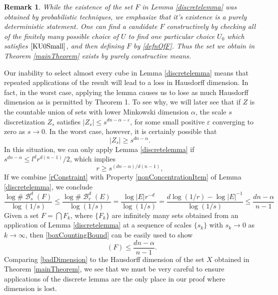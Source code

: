 \documentclass[dvipsnames,letterpaper,12pt]{article}
\numberwithin{equation}{section}
\theoremstyle{plain}
\newtheorem*{remark}{Remark}
\DeclareMathOperator{\hausdim}{\dim_{\mathbf{H}}}
\DeclareMathOperator{\B}{\mathcal{B}}
\begin{document}
\begin{remark}
	While the existence of the set $F$ in Lemma \ref{discretelemma} was obtained by probabilistic techniques, we emphasize that it's existence is a purely deterministic statement. One can find a candidate $F$ constructively by checking all of the finitely many possible choice of $U$ to find one particular choice $U_0$ which satisfies $\eqref{KU0Small}$, and then defining $F$ by \eqref{defnOfF}.
	Thus the set we obtain in Theorem \ref{mainTheorem} exists by purely constructive means.
\end{remark}

Our inability to select almost every cube in Lemma \ref{discretelemma} means that repeated applications of the result will lead to a loss in Hausdorff dimension. In fact, in the worst case, applying the lemma causes us to lose as much Hausdorff dimension as is permitted by Theorem 1. To see why, we will later see that if $Z$ is the countable union of sets with lower Minkowski dimension $\alpha$, the scale $s$ discretization $Z_s$ satisfies $|Z_s| \leq s^{dn - \alpha - \varepsilon}$, for some small positive $\varepsilon$ converging to zero as $s \to 0$. In the worst case, however, it is certainly possible that
%
\begin{equation}\label{ZsBadBound}
	|Z_s| \geq s^{dn - \alpha}.
\end{equation}
%
In this situation, we can only apply Lemma \ref{discretelemma} if $s^{dn - \alpha} \leq l^d r^{d(n-1)}/2$, which implies
%
\begin{equation} \label{rConstraint}
	r \geq s^{(dn - \alpha)/d(n-1)},
\end{equation}
%
If we combine \eqref{rConstraint} with Property \ref{nonConcentrationItem} of Lemma \ref{discretelemma}, we conclude
%
\begin{equation} \label{boxCountingBound}
	\frac{\log \# \B^d_s(F)}{\log(1/s)} \leq \frac{\log \# \B^d_r(E)}{\log(1/s)} = \frac{\log |E| r^{-d}}{\log(1/s)} = \frac{d \log(1/r) - \log |E|^{-1}}{\log(1/s)} \leq \frac{dn - \alpha}{n - 1}
\end{equation}
%
Given a set $F = \bigcap F_k$, where $\{ F_k \}$ are infinitely many sets obtained from an application of Lemma \ref{discretelemma} at a sequence of scales $\{ s_k \}$ with $s_k \to 0$ as $k \to \infty$, then \eqref{boxCountingBound} can be easily used to show
%
\begin{equation} \label{badDimension}
	\hausdim(F) \leq \frac{dn - \alpha}{n-1}.
\end{equation}
%
Comparing \eqref{badDimension} to the Hausdorff dimension of the set $X$ obtained in Theorem \ref{mainTheorem}, we see that we must be very careful to ensure applications of the discrete lemma are the only place in our proof where dimension is lost.
\end{document}
